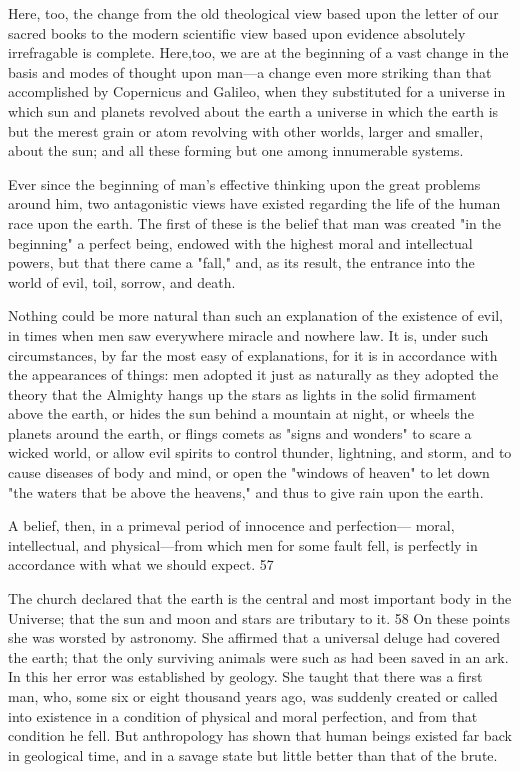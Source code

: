 Here, too, the change from the old theological view based upon the letter of our sacred books
to the modern scientific view based upon evidence absolutely irrefragable is complete. Here,too, we are at the beginning of a vast change in the basis and modes of thought upon man—a
change even more striking than that accomplished by Copernicus and Galileo, when they
substituted for a universe in which sun and planets revolved about the earth a universe in
which the earth is but the merest grain or atom revolving with other worlds, larger and
smaller, about the sun; and all these forming but one among innumerable systems.

Ever since the beginning of man's effective thinking upon the great problems around him,
two antagonistic views have existed regarding the life of the human race upon the earth. The
first of these is the belief that man was created "in the beginning" a perfect being, endowed
with the highest moral and intellectual powers, but that there came a "fall," and, as its result,
the entrance into the world of evil, toil, sorrow, and death.

Nothing could be more natural than such an explanation of the existence of evil, in times
when men saw everywhere miracle and nowhere law. It is, under such circumstances, by far
the most easy of explanations, for it is in accordance with the appearances of things: men
adopted it just as naturally as they adopted the theory that the Almighty hangs up the stars as
lights in the solid firmament above the earth, or hides the sun behind a mountain at night, or
wheels the planets around the earth, or flings comets as "signs and wonders" to scare a
wicked world, or allow evil spirits to control thunder, lightning, and storm, and to cause
diseases of body and mind, or open the "windows of heaven" to let down "the waters that be
above the heavens," and thus to give rain upon the earth.

A belief, then, in a primeval period of innocence and perfection— moral, intellectual, and
physical—from which men for some fault fell, is perfectly in accordance with what we
should expect. 57

The church declared that the earth is the central and most important body in the Universe;
that the sun and moon and stars are tributary to it. 58 On these points she was worsted by
astronomy. She affirmed that a universal deluge had covered the earth; that the only
surviving animals were such as had been saved in an ark. In this her error was established by
geology. She taught that there was a first man, who, some six or eight thousand years ago,
was suddenly created or called into existence in a condition of physical and moral perfection,
and from that condition he fell. But anthropology has shown that human beings existed far
back in geological time, and in a savage state but little better than that of the brute.

